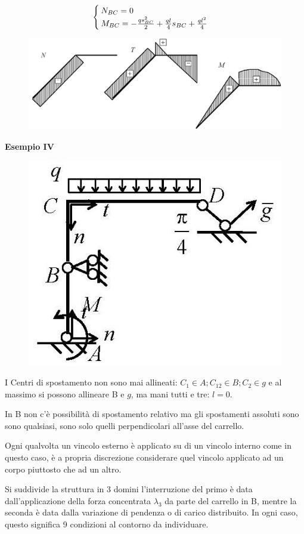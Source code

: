 \documentclass{article}
\begin{document}
\begin{adjustwidth}{2in}{}
\[\begin{cases}
		N_{BC} = 0 \\
		
		M_{BC} =  -{qs^2_{BC}\over2} + {ql\over4}s_{BC} + {ql^2\over4}
	\end{cases}
	\]
	\begin{figure}[H]
		\centering
		\includegraphics[width=0.7\linewidth]{"immagini/1.PARTE5_Pagina_24"}
	\end{figure}

	\begin{center}
		\textbf{Esempio IV}
	\end{center}
	\begin{figure}[H]
		\centering
		\includegraphics[width=0.3\linewidth]{"immagini/1.PARTE5_Pagina_25"}
	\end{figure}
	I Centri di spostamento non sono mai allineati: $C_1\in A; C_{12}\in B; C_2\in g$ e al massimo si possono allineare B e $g$, ma mani tutti e tre: $l=0$. \newline 
	
	In B non c'è possibilità di spostamento relativo ma gli spostamenti assoluti sono sono qualsiasi, sono solo quelli perpendicolari all'asse del carrello. \newline 
	
	Ogni qualvolta un vincolo esterno è applicato su di un vincolo interno come in questo caso, è a propria discrezione considerare quel vincolo applicato ad un corpo piuttosto che ad un altro. \newline 
	
	Si suddivide la struttura in 3 domini l'interruzione del primo è data dall'applicazione della forza concentrata $\lambda_3$ da parte del carrello in B, mentre la seconda è data dalla variazione di pendenza o di carico distribuito. In ogni caso, questo significa 9 condizioni al contorno da individuare. 
	

\end{adjustwidth}
\end{document}
